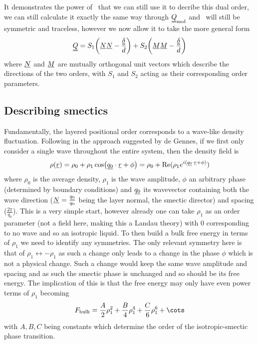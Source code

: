 \documentclass[12pt]{article}
\newcommand{\suf}[2]{\stackunder[0.5pt]{\stackunder[1pt]{\ensuremath{#1}}{\rule{\widthof{\ensuremath{#2}}*\real{0.9}}{.1ex}}}{}}
\newcommand{\duf}[2]{\stackunder[0.5pt]{\stackunder[0.8pt]{\stackunder[1pt]{\ensuremath{#1}}{\rule{\widthof{\ensuremath{#2}}*\real{0.9}}{.1ex}}}{\rule{\widthof{\ensuremath{#2}}*\real{0.9}}{.1ex}}}{}}
\newcommand{\su}[1]{\suf{#1}{#1}}
\newcommand{\du}[1]{\duf{#1}{#1}}
\newcommand{\ssu}[1]{\scriptsize\su{#1}\normalsize}
\newcommand{\QQ}{\du{Q}}
\newcommand{\dudelta}{\du{\delta}}
\begin{document}
It demonstrates the power of \QQ\ that we can still use it to decribe this dual order, we can still calculate it exactly the same way through $\du{Q}_\text{mol}$ and \QQ\ will still be symmetric and traceless, however we now allow it to take the more general form
\begin{equation}
    \du{Q} = S_1\qty(\su{N} \su{N} - \frac{\dudelta}{d}) + S_2\qty(\su{M} \su{M} - \frac{\dudelta}{d})
\end{equation}
where $\su{N}$ and $\su{M}$ are mutually orthogonal unit vectors which describe the directions of the two orders, with $S_1$ and $S_2$ acting as their corresponding order parameters.


\subsection{Describing smectics\cite{oswaldSmecticColumnarLiquid2005}}\label{sec:degennes}
Fundamentally, the layered positional order corresponds to a wave-like density fluctuation.
Following \cite{oswaldSmecticColumnarLiquid2005} in the approach suggested by de Gennes, if we first only consider a single wave throughout the entire system, then the density field is
\begin{equation}\label{eq:density_base}
    \rho(\su{r}) = \rho_0 + \rho_1\cos(\su{q_0}\cdot\su{r} + \phi) = \rho_0 + \Re(\rho_1 e^{i(\ssu{q_0} \cdot \ssu{r} + \phi)})
\end{equation}
where $\rho_0$ is the average density, $\rho_1$ is the wave amplitude, $\phi$ an arbitrary phase (determined by boundary conditions) and $\su{q_0}$ its wavevector containing both the wave direction ($\su{N} = \frac{\ssu{q_0}}{q_0}$ being the layer normal, the smectic director) and spacing ($\frac{2\pi}{q_0}$).
This is a very simple start, however already one can take $\rho_1$ as an order parameter (not a field here, making this a Landau theory) with 0 corresponding to no wave and so an isotropic liquid.
To then build a bulk free energy in terms of $\rho_1$ we need to identify any symmetries.
The only relevant symmetry here is that of $\rho_1 \leftrightarrow -\rho_1$ as such a change only leads to a change in the phase $\phi$ which is not a physical change.
Such a change would keep the same wave amplitude and spacing and as such the smectic phase is unchanged and so should be its free energy.
The implication of this is that the free energy may only have even power terms of $\rho_1$ becoming
\begin{equation}
    F_\text{bulk} = \frac{A}{2}\rho_1^2 + \frac{B}{4}\rho_1^4 + \frac{C}{6}\rho_1^6 + \cots
\end{equation}
with $A, B, C$ being constants which determine the order of the isotropic-smectic phase transition\cite{oswaldSmecticColumnarLiquid2005}.
\end{document}
